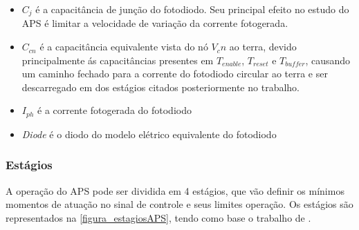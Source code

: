 \begin{itemize}
    \item $C_j$ \'e a capacit\^ancia de jun{\c c}\~ao do fotodiodo. Seu principal efeito no estudo do APS \'e limitar a velocidade de varia{\c c}\~ao da corrente fotogerada.
    \item $C_{cn}$ \'e a capacit\^ancia equivalente vista do n\'o \emph{$V_cn$} ao terra, devido principalmente \'as capacit\^ancias presentes em \emph{$T_{enable}$},  \emph{$T_{reset}$} e \emph{$T_{buffer}$}, causando um caminho fechado para a corrente do fotodiodo circular ao terra e ser descarregado em dos est\'agios citados posteriormente no trabalho.
    \item \emph{$I_{ph}$} \'e a corrente fotogerada do fotodiodo
    \item \emph{Diode} \'e o diodo do modelo el\'etrico equivalente do fotodiodo
    \emph{}
\end{itemize}

\subsubsection{Est\'agios}
\label{estagiosAPS}

A operação do APS pode ser dividida em 4 est\'agios, que vão definir os m\'inimos momentos de  atua{\c c}\~ao no sinal de controle e seus limites opera{\c c}\~ao. Os est\'agios s\~ao representados na \autoref{figura_estagiosAPS}, tendo como base o trabalho de \cite{LidianeCampos}.

